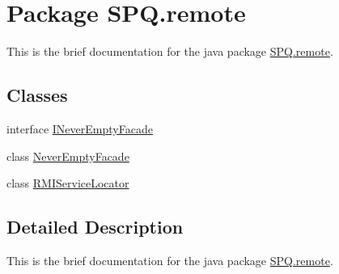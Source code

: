 \hypertarget{namespace_s_p_q_1_1remote}{}\section{Package S\+P\+Q.\+remote}
\label{namespace_s_p_q_1_1remote}


This is the brief documentation for the java package \mbox{\hyperlink{namespace_s_p_q_1_1remote}{S\+P\+Q.\+remote}}.  


\subsection*{Classes}
\begin{DoxyCompactItemize}
\item 
interface \mbox{\hyperlink{interface_s_p_q_1_1remote_1_1_i_never_empty_facade}{I\+Never\+Empty\+Facade}}
\item 
class \mbox{\hyperlink{class_s_p_q_1_1remote_1_1_never_empty_facade}{Never\+Empty\+Facade}}
\item 
class \mbox{\hyperlink{class_s_p_q_1_1remote_1_1_r_m_i_service_locator}{R\+M\+I\+Service\+Locator}}
\end{DoxyCompactItemize}


\subsection{Detailed Description}
This is the brief documentation for the java package \mbox{\hyperlink{namespace_s_p_q_1_1remote}{S\+P\+Q.\+remote}}. 